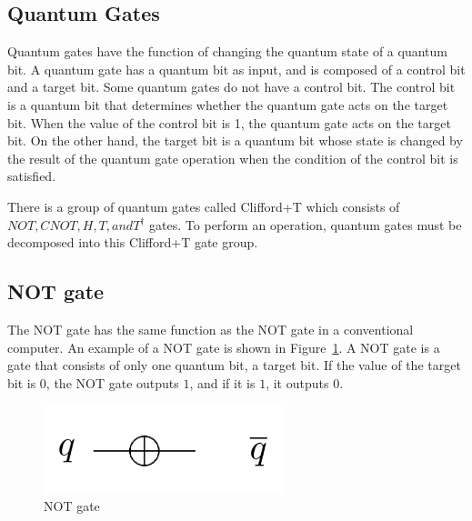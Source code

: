\subsection{Quantum Gates}
Quantum gates have the function of changing the quantum state of a quantum bit.
A quantum gate has a quantum bit as input, and is composed of a control bit and a target bit.
Some quantum gates do not have a control bit.
The control bit is a quantum bit that determines whether the quantum gate acts on the target bit.
When the value of the control bit is 1, the quantum gate acts on the target bit.
On the other hand, the target bit is a quantum bit whose state is changed by the result of the quantum gate operation when the condition of the control bit is satisfied.
\par
There is a group of quantum gates called Clifford+T\cite{zhou2000methodology}
which consists of $NOT, CNOT, H, T, and T^{\dagger}$ gates.
To perform an operation, quantum gates must be decomposed into this Clifford+T gate group\cite{boykin2000new}.
\par
{}
\subsection{NOT gate}
The NOT gate has the same function as the NOT gate in a conventional computer. An example of a NOT gate is shown in
Figure~\ref{not_gate}. A NOT gate is a gate that consists of only one quantum bit, a target bit.
If the value of the target bit is $0$, the NOT gate outputs $1$, and if it is $1$, it outputs $0$.
\begin{figure}[tbp]
\centering
\includegraphics[width=7cm]{img/notgate.pdf}
\caption{NOT gate}
\label{not_gate}
\end{figure}
